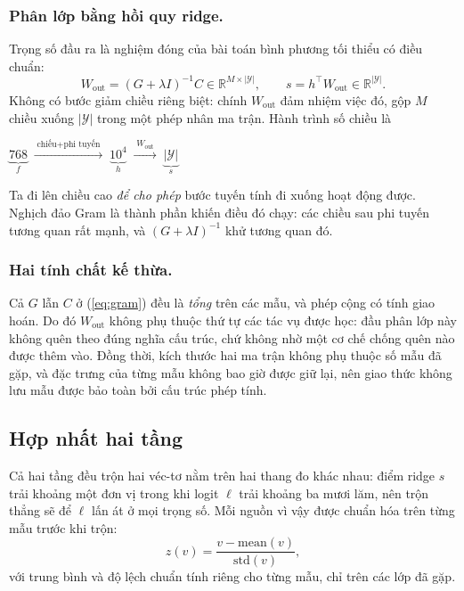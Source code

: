 \documentclass[runningheads]{llncs}
\begin{document}
\subsubsection{Phân lớp bằng hồi quy ridge.}
Trọng số đầu ra là nghiệm đóng của bài toán bình phương tối thiểu có điều chuẩn:
\begin{equation}
W_{\mathrm{out}} = (G + \lambda I)^{-1} C \in \mathbb{R}^{M \times |\mathcal{Y}|},
\qquad
s = h^{\top} W_{\mathrm{out}} \in \mathbb{R}^{|\mathcal{Y}|} .
\label{eq:ridge}
\end{equation}
Không có bước giảm chiều riêng biệt: chính $W_{\mathrm{out}}$ đảm nhiệm việc đó,
gộp $M$ chiều xuống $|\mathcal{Y}|$ trong một phép nhân ma trận. Hành trình số
chiều là
\begin{center}
$\underbrace{768}_{f}
\;\xrightarrow{\;\text{chiếu} + \text{phi tuyến}\;}\;
\underbrace{10^4}_{h}
\;\xrightarrow{\;W_{\mathrm{out}}\;}\;
\underbrace{|\mathcal{Y}|}_{s}$
\end{center}
Ta đi lên chiều cao \emph{để cho phép} bước tuyến tính đi xuống hoạt động được.
Nghịch đảo Gram là thành phần khiến điều đó chạy: các chiều sau phi tuyến tương
quan rất mạnh, và $(G + \lambda I)^{-1}$ khử tương quan đó.

\subsubsection{Hai tính chất kế thừa.}
Cả $G$ lẫn $C$ ở (\ref{eq:gram}) đều là \emph{tổng} trên các mẫu, và phép cộng có
tính giao hoán. Do đó $W_{\mathrm{out}}$ không phụ thuộc thứ tự các tác vụ được
học: đầu phân lớp này không quên theo đúng nghĩa cấu trúc, chứ không nhờ một cơ
chế chống quên nào được thêm vào. Đồng thời, kích thước hai ma trận không phụ
thuộc số mẫu đã gặp, và đặc trưng của từng mẫu không bao giờ được giữ lại, nên
giao thức không lưu mẫu được bảo toàn bởi cấu trúc phép tính.

\subsection{Hợp nhất hai tầng}

Cả hai tầng đều trộn hai véc-tơ nằm trên hai thang đo khác nhau: điểm ridge $s$
trải khoảng một đơn vị trong khi logit $\ell$ trải khoảng ba mươi lăm, nên trộn
thẳng sẽ để $\ell$ lấn át ở mọi trọng số. Mỗi nguồn vì vậy được chuẩn hóa trên
từng mẫu trước khi trộn:
\begin{equation}
z(v) = \frac{v - \mathrm{mean}(v)}{\mathrm{std}(v)} ,
\label{eq:znorm}
\end{equation}
với trung bình và độ lệch chuẩn tính riêng cho từng mẫu, chỉ trên các lớp đã gặp.
\end{document}
